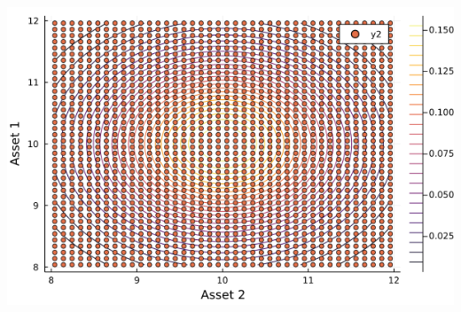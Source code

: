\documentclass[
  ignorenonframetext,
]{beamer}
\begin{document}
\begin{frame}{}
\protect\hypertarget{section-1}{}
\begin{center}\includegraphics[width=0.95\paperheight]{complexity_files/figure-beamer/unnamed-chunk-23-1} \end{center}
\end{frame}
\end{document}
